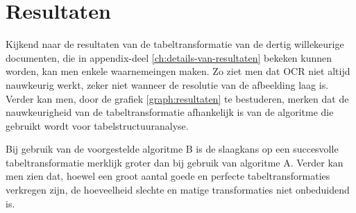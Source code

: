 
\chapter{Resultaten}
\label{ch:resultaten}

Kijkend naar de resultaten van de tabeltransformatie van de dertig willekeurige documenten, die in appendix-deel \ref{ch:details-van-resultaten} bekeken kunnen worden, kan men enkele waarnemeingen maken. Zo ziet men dat \Gls{OCR} niet altijd nauwkeurig werkt, zeker niet wanneer de resolutie van de afbeelding laag is. Verder kan men, door de grafiek \ref{graph:resultaten} te bestuderen, merken dat de nauwkeurigheid van de tabeltransformatie afhankelijk is van de algoritme die gebruikt wordt voor tabelstructuuranalyse. 


Bij gebruik van de voorgestelde algoritme B is de slaagkans op een succesvolle tabeltransformatie merklijk groter dan bij gebruik van algoritme A. Verder kan men zien dat, hoewel een groot aantal goede en perfecte tabeltransformaties verkregen zijn, de hoeveelheid slechte en matige transformaties niet onbeduidend is.
